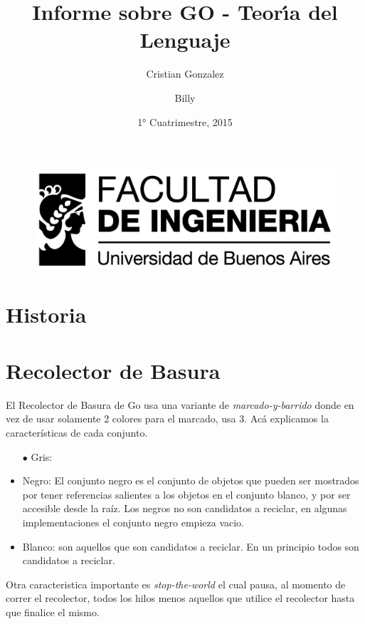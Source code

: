 \documentclass{article}
\begin{document}
\begin{figure}
\centering
\includegraphics[width=0.9\linewidth]{./logo_fiuba_alta}
\label{fig:logo_fiuba_alta}
\end{figure}

\title{Informe sobre GO - Teor\'{\i}a del Lenguaje}
\author{Cristian Gonzalez \and Billy}
\date{1° Cuatrimestre, 2015}
\maketitle
\section{Historia}
\section{Recolector de Basura}
El Recolector de Basura de Go usa una variante de \textit{marcado-y-barrido} donde en vez de usar solamente 2 colores para el marcado, usa 3. 
Ac\'{a} explicamos la características de cada conjunto.
\begin{itemize}
\item[$\bullet$] Gris:
\item Negro: El conjunto negro es el conjunto de objetos que pueden ser mostrados por tener referencias salientes a los objetos en el conjunto blanco, y por ser accesible desde la raíz. Los negros no son candidatos a reciclar, en algunas implementaciones el conjunto negro empieza vacio. 
\item Blanco: son aquellos que son candidatos a reciclar. En un principio todos son candidatos a reciclar. 
\end{itemize}

Otra caracteristica importante es \textit{stop-the-world} el cual pausa, al momento de correr el recolector, todos los hilos menos aquellos que utilice el recolector hasta que finalice el mismo. 
\end{document}
